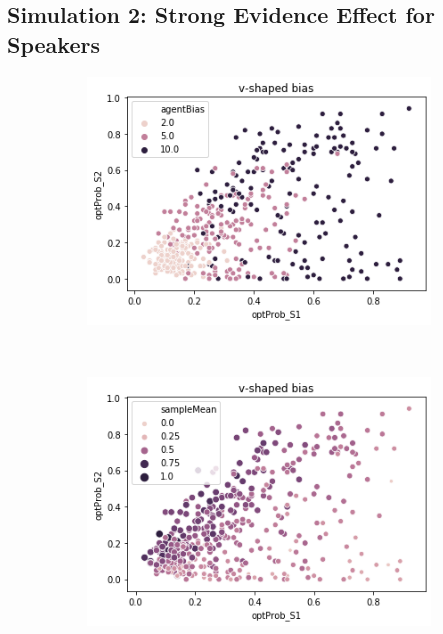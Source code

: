\documentclass[10pt,letterpaper]{article}
\begin{document}
\subsection{Simulation 2: Strong Evidence Effect for Speakers}
\begin{figure}[h]
\centering
\begin{subfigure}{0.45\textwidth}
	\includegraphics[width=\textwidth]{figures/seeVBias.png}
\end{subfigure}
~
\begin{subfigure}{0.45\textwidth}
	\includegraphics[width=\textwidth]{figures/seeVMean.png}
\end{subfigure}


\end{figure}
\end{document}
